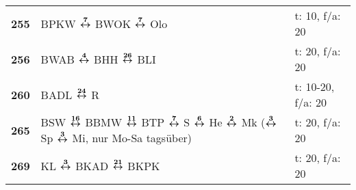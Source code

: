 \begin{minipage}[t]{0.45\textwidth}
\begin{tabular}{>{\bfseries}L{1.2cm}L{9.0cm}L{3.0cm}}
\bus{} 255    & BPKW $\boldsymbol{\overset{7}{\leftrightarrow}}$ BWOK $\boldsymbol{\overset{7}{\leftrightarrow}}$ Olo                                                                                                                               & t: 10, f/a: 20             \\
\bus{} 256    & BWAB $\boldsymbol{\overset{4}{\leftrightarrow}}$ BHH $\boldsymbol{\overset{26}{\leftrightarrow}}$ BLI                                                                                                                               & t: 20, f/a: 20             \\
\bus{} 260    & BADL $\boldsymbol{\overset{24}{\leftrightarrow}}$ R                                                                                                                                                 & t: 10-20, f/a: 20          \\
\bus{} 265    & BSW $\boldsymbol{\overset{16}{\leftrightarrow}}$ BBMW $\boldsymbol{\overset{11}{\leftrightarrow}}$ BTP $\boldsymbol{\overset{7}{\leftrightarrow}}$ S $\boldsymbol{\overset{6}{\leftrightarrow}}$ He $\boldsymbol{\overset{2}{\leftrightarrow}}$ Mk ($\boldsymbol{\overset{3}{\leftrightarrow}}$ Sp $\boldsymbol{\overset{3}{\leftrightarrow}}$ Mi, nur Mo-Sa tagsüber)                              & t: 20, f/a: 20             \\
\bus{} 269    & KL $\boldsymbol{\overset{3}{\leftrightarrow}}$ BKAD $\boldsymbol{\overset{21}{\leftrightarrow}}$ BKPK                                                                                                                               & t: 20, f/a: 20             \\
\hline
\end{tabular}
\end{minipage}
\begin{minipage}[t]{0.05\textwidth}
\phantom{Tor}
\end{minipage}

